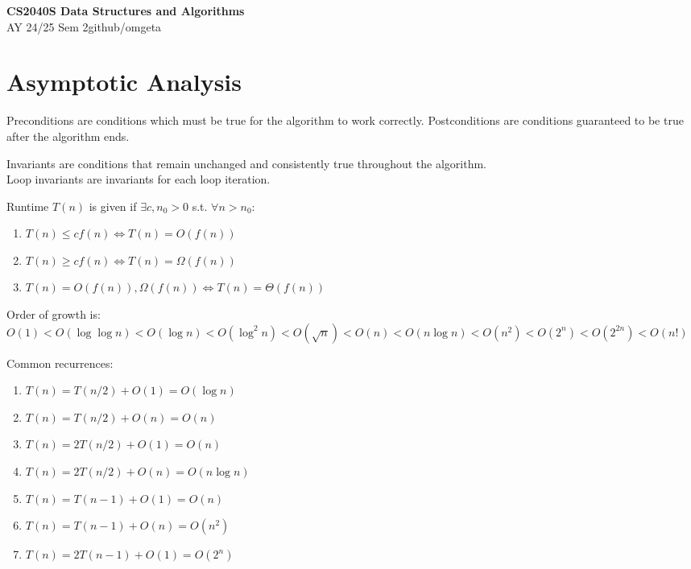 \documentclass[12pt, a4paper]{article}
\newcommand{\mytitle}{CS2040S Data Structures and Algorithms}
\newcommand{\myauthor}{github/omgeta}
\newcommand{\mydate}{AY 24/25 Sem 2}
\begin{document}
\raggedright
\footnotesize
\begin{multicols*}{3}
\setlength{\premulticols}{1pt}
\setlength{\postmulticols}{1pt}
\setlength{\multicolsep}{1pt}
\setlength{\columnsep}{2pt}

{\normalsize{\textbf{\mytitle}}} \\
{\footnotesize{\mydate\hspace{2pt}\textemdash\hspace{2pt}\myauthor}}
\vspace{-0.5em}
\section{Asymptotic Analysis}
Preconditions are conditions which must be true for the algorithm to work correctly.
Postconditions are conditions guaranteed to be true after the algorithm ends.

Invariants are conditions that remain unchanged and consistently true throughout the algorithm. \\Loop invariants are invariants for each loop iteration.

Runtime $T(n)$ is given if $\exists c, n_0>0$ s.t. $\forall n > n_0$:
\begin{enumerate}[\roman*.]
  \item $T(n) \leq cf(n) \iff T(n)=O(f(n))$
  \item $T(n) \geq cf(n) \iff T(n)=\Omega(f(n))$
  \item $T(n) = O(f(n)), \Omega(f(n))\iff T(n)=\Theta(f(n))$
\end{enumerate}

Order of growth is:\\
$O(1) < O(\log\log n) < O(\log n) < O(\log^2 n) < O(\sqrt{n}) < O(n) < O(n\log n) < O(n^2) < O(2^n) < O(2^{2n}) < O(n!)$

Common recurrences:
\begin{enumerate}[\roman*.]
  \item $T(n) = T(n/2) + O(1) = O(\log n)$
  \item $T(n) = T(n/2) + O(n) = O(n)$
  \item $T(n) = 2T(n/2) + O(1) = O(n)$
  \item $T(n) = 2T(n/2) + O(n) = O(n\log n)$
  \item $T(n) = T(n - 1) + O(1) = O(n)$
  \item $T(n) = T(n - 1) + O(n) = O(n^2)$
  \item $T(n) = 2T(n - 1) + O(1) = O(2^n)$
\end{enumerate}


\end{multicols*}
\end{document}
